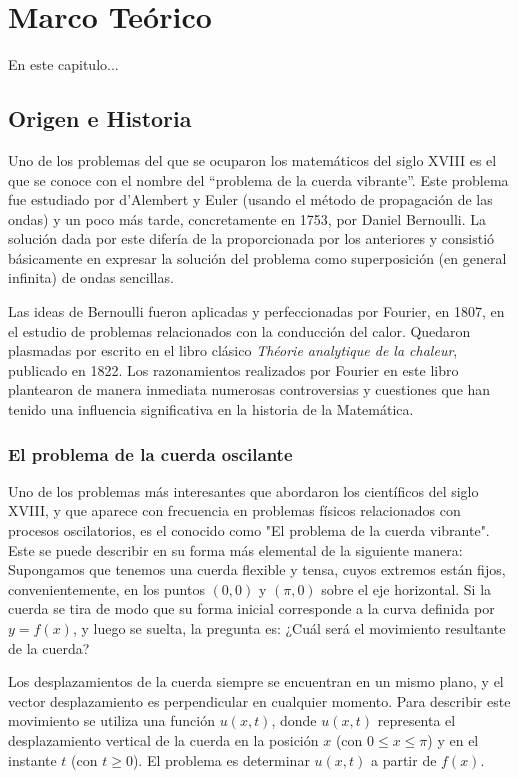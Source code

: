 \chapter{Marco Teórico}\label{ch:Marco Teórico}
En este capitulo...


\section{Origen e Historia}
Uno de los problemas del que se ocuparon los matemáticos del siglo XVIII es el que se conoce con el nombre del ``problema de la cuerda vibrante''. Este problema fue estudiado por d'Alembert y Euler (usando el método de propagación de las ondas) y un poco más tarde, concretamente en 1753, por Daniel Bernoulli. La solución dada por este difería de la proporcionada por los anteriores y consistió básicamente en expresar la solución del problema como superposición (en general infinita) de ondas sencillas. 

Las ideas de Bernoulli fueron aplicadas y perfeccionadas por Fourier, en 1807, en el estudio de problemas relacionados con la conducción del calor. Quedaron plasmadas por escrito en el libro clásico \emph{Théorie analytique de la chaleur}, publicado en 1822. Los razonamientos realizados por Fourier en este libro plantearon de manera inmediata numerosas controversias y cuestiones que han tenido una influencia significativa en la historia de la Matemática.

\subsection{El problema de la cuerda oscilante}

Uno de los problemas más interesantes que abordaron los científicos del siglo XVIII, y que aparece con frecuencia en problemas físicos relacionados con procesos oscilatorios, es el conocido como "El problema de la cuerda vibrante". Este se puede describir en su forma más elemental de la siguiente manera: Supongamos que tenemos una cuerda flexible y tensa, cuyos extremos están fijos, convenientemente, en los puntos $(0, 0)$ y $(\pi, 0)$ sobre el eje horizontal. Si la cuerda se tira de modo que su forma inicial corresponde a la curva definida por $y = f(x)$, y luego se suelta, la pregunta es: ¿Cuál será el movimiento resultante de la cuerda?

Los desplazamientos de la cuerda siempre se encuentran en un mismo plano, y el vector desplazamiento es perpendicular en cualquier momento. Para describir este movimiento se utiliza una función $u(x, t)$, donde $u(x, t)$ representa el desplazamiento vertical de la cuerda en la posición $x$ (con $0 \leq x \leq \pi$) y en el instante $t$ (con $t \geq 0$). El problema es determinar $u(x, t)$ a partir de $f(x)$.

